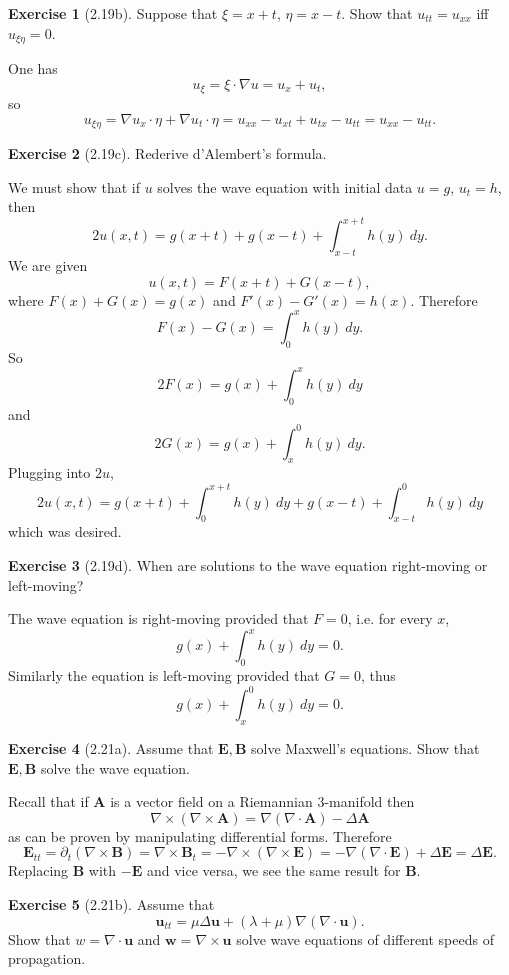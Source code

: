\documentclass[10pt]{article}
\theoremstyle{definition}
\newtheorem{exer}{Exercise}
\begin{document}
\begin{exer}[2.19b]
Suppose that $\xi = x + t$, $\eta = x - t$. Show that $u_{tt} = u_{xx}$ iff $u_{\xi\eta} = 0$.
\end{exer}

One has
$$u_\xi = \xi \cdot \nabla u = u_x + u_t,$$
so
$$u_{\xi\eta} = \nabla u_x \cdot \eta + \nabla u_t \cdot \eta = u_{xx} - u_{xt} + u_{tx} - u_{tt} = u_{xx} - u_{tt}.$$

\begin{exer}[2.19c]
Rederive d'Alembert's formula.
\end{exer}

We must show that if $u$ solves the wave equation with initial data $u = g$, $u_t = h$, then
$$2u(x, t) = g(x + t) + g(x - t) + \int_{x - t}^{x + t} h(y) ~dy.$$
We are given
$$u(x, t) = F(x + t) + G(x - t),$$
where $F(x) + G(x) = g(x)$ and $F'(x) - G'(x) = h(x)$. Therefore
$$F(x) - G(x) = \int_0^x h(y)~dy.$$
So
$$2F(x) = g(x) + \int_0^x h(y)~dy$$
and
$$2G(x) = g(x) + \int_x^0 h(y)~dy.$$
Plugging into $2u$,
$$2u(x, t) = g(x + t) + \int_0^{x+t}h(y)~dy + g(x - t) + \int_{x - t}^0 h(y)~dy$$
which was desired.

\begin{exer}[2.19d]
When are solutions to the wave equation right-moving or left-moving?
\end{exer}

The wave equation is right-moving provided that $F = 0$, i.e. for every $x$,
$$g(x) + \int_0^x h(y)~dy= 0.$$
Similarly the equation is left-moving provided that $G = 0$, thus
$$g(x) + \int_x^0 h(y)~dy = 0.$$

\begin{exer}[2.21a]
Assume that $\mathbf E, \mathbf B$ solve Maxwell's equations. Show that $\mathbf E,\mathbf B$ solve the wave equation.
\end{exer}

Recall that if $\mathbf A$ is a vector field on a Riemannian $3$-manifold then
$$\nabla \times (\nabla \times \mathbf A) = \nabla(\nabla \cdot \mathbf A) - \Delta \mathbf A$$
as can be proven by manipulating differential forms.
Therefore
$$\mathbf E_{tt} = \partial_t(\nabla \times \mathbf B) = \nabla \times \mathbf B_t = -\nabla \times(\nabla \times \mathbf E) = -\nabla(\nabla \cdot \mathbf E) + \Delta \mathbf E = \Delta \mathbf E.$$
Replacing $\mathbf B$ with $-\mathbf E$ and vice versa, we see the same result for $\mathbf B$.

\begin{exer}[2.21b]
Assume that
$$\mathbf u_{tt} = \mu\Delta \mathbf u + (\lambda + \mu)\nabla(\nabla \cdot \mathbf u).$$
Show that $w = \nabla \cdot \mathbf u$ and $\mathbf w = \nabla \times \mathbf u$ solve wave equations of different speeds of propagation.
\end{exer}
\end{document}
